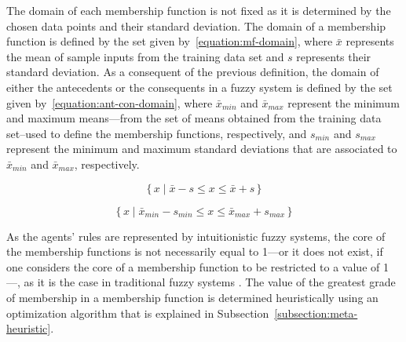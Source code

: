 ﻿\documentclass{ieeeaccess}
\begin{document}

The domain of each membership function is not fixed as it is
determined by the chosen data points and their standard deviation. The
domain of a membership function is defined by the set given
by~\ref{equation:mf-domain}, where $\bar{x}$ represents the mean of
sample inputs from the training data set and $s$ represents their
standard deviation. As a consequent of the previous definition, the
domain of either the antecedents or the consequents in a fuzzy system
is defined by the set given by~\ref{equation:ant-con-domain}, where
$\bar{x}_{min}$ and $\bar{x}_{max}$ represent the minimum and maximum
means---from the set of means obtained from the training data
set--used to define the membership functions, respectively, and
$s_{min}$ and $s_{max}$ represent the minimum and maximum standard
deviations that are associated to $\bar{x}_{min}$ and $\bar{x}_{max}$,
respectively. %


\begin{equation}
  \label{equation:mf-domain}
  \{\,x \mid \bar{x} - s \leq x \leq \bar{x} + s \,\}
\end{equation}

\begin{equation}
  \label{equation:ant-con-domain}
  \{\,x \mid \bar{x}_{min} - s_{min} \leq x \leq \bar{x}_{max} + s_{max} \,\}
\end{equation}

As the agents' rules are represented by intuitionistic fuzzy systems, the core of
the membership functions is not necessarily equal to 1---or it does not exist,
if one considers the core of a membership function to be restricted to a value
of 1---, as it is the case in traditional fuzzy systems \cite{wygralak2000axiomatic}. %
The value of the greatest
grade of membership in a membership function is determined heuristically using
an optimization algorithm that is explained in
Subsection~\ref{subsection:meta-heuristic}.
\end{document}
